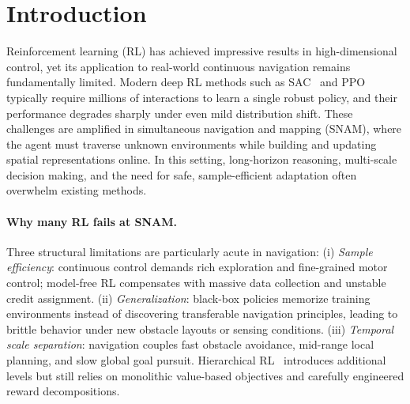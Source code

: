\documentclass{article} %
\begin{document}
\section{Introduction}
\label{sec:intro}

Reinforcement learning (RL) has achieved impressive results in high-dimensional control, yet its application to real-world continuous navigation remains fundamentally limited. Modern deep RL methods such as SAC~\citep{haarnoja2018sac} and PPO~\citep{schulman2017ppo} typically require millions of interactions to learn a single robust policy, and their performance degrades sharply under even mild distribution shift. These challenges are amplified in simultaneous navigation and mapping (SNAM), where the agent must traverse unknown environments while building and updating spatial representations online. In this setting, long-horizon reasoning, multi-scale decision making, and the need for safe, sample-efficient adaptation often overwhelm existing methods.

\paragraph{Why many RL fails at SNAM.}
Three structural limitations are particularly acute in navigation:
(i) \emph{Sample efficiency}: continuous control demands rich exploration and fine-grained motor control; model-free RL compensates with massive data collection and unstable credit assignment.
(ii) \emph{Generalization}: black-box policies memorize training environments instead of discovering transferable navigation principles, leading to brittle behavior under new obstacle layouts or sensing conditions.
(iii) \emph{Temporal scale separation}: navigation couples fast obstacle avoidance, mid-range local planning, and slow global goal pursuit. Hierarchical RL~\citep{sutton1998between,vezhnevets2017feudal} introduces additional levels but still relies on monolithic value-based objectives and carefully engineered reward decompositions.
\end{document}
